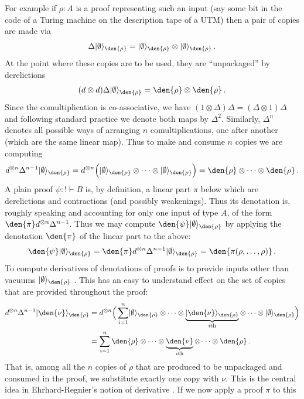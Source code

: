 \documentclass[english,letter paper,12pt,reqno]{article}
\DeclarePairedDelimiter\ket{\lvert}{\rangle}
\theoremstyle{definition}
\def\vacu{\ket{\emptyset}}
\def\be{\begin{equation}}
\def\ee{\end{equation}}
\begin{document}
For example if $\rho : A$ is a proof representing such an input (say some bit in the code of a Turing machine on the description tape of a UTM) then a pair of copies are made via
\be
\Delta \vacu_{\den{\rho}} = \vacu_{\den{\rho}} \otimes \vacu_{\den{\rho}}\,.
\ee
At the point where these copies are to be used, they are ``unpackaged'' by derelictions
\be\label{eq:d_otimes_2}
(d \otimes d) \Delta \vacu_{\den{\rho}} = \den{\rho} \otimes \den{\rho}\,.
\ee
Since the comultiplication is co-associative, we have $(1 \otimes \Delta)\Delta = (\Delta \otimes 1)\Delta$ and following standard practice we denote both maps by $\Delta^2$. Similarly, $\Delta^n$ denotes all possible ways of arranging $n$ comultiplications, one after another (which are the same linear map). Thus to make and consume $n$ copies we are computing
\be
d^{\otimes n} \Delta^{n-1} \vacu_{\den{\rho}} = d^{\otimes n} \Big( \vacu_{\den{\rho}} \otimes \cdots \otimes \vacu_{\den{\rho}} \Big) = \den{\rho} \otimes \cdots \otimes \den{\rho}\,.
\ee
A plain proof $\psi: {!} \vdash B$ is, by definition, a linear part $\pi$ below which are derelictions and contractions (and possibly weakenings). Thus its denotation is, roughly speaking and accounting for only one input of type $A$, of the form $\den{\pi} d^{\otimes n} \Delta^{n-1}$. Thus we may compute $\den{\psi}\vacu_{\den{\rho}}$ by applying the denotation $\den{\pi}$ of the linear part to the above:
\be\label{eq:normal_evaluation}
\den{\psi} \vacu_{\den{\rho}} = \den{\pi} d^{\otimes n} \Delta^{n-1} \vacu_{\den{\rho}} = \den{\pi(\rho,\ldots,\rho)}\,.
\ee
To compute derivatives of denotations of proofs is to provide inputs other than vacuums $\vacu_{\den{\rho}}$ \cite[Corollary 4.5]{clift2018derivatives}. This has an easy to understand effect on the set of copies that are provided throughout the proof:
\begin{align}
d^{\otimes n} \Delta^{n-1} \ket{\den{\nu}}_{\den{\rho}} &= d^{\otimes n} \Big( \sum_{i=1}^n \vacu_{\den{\rho}} \otimes \cdots \otimes \underbrace{\ket{\den{\nu}}_{\den{\rho}}}_{i\text{th}} \otimes \cdots \otimes \vacu_{\den{\rho}} \Big) \nonumber\\
&= \sum_{i=1}^n \den{\rho} \otimes \cdots \otimes \underbrace{\den{\nu}}_{i\text{th}} \otimes \cdots \otimes \den{\rho}\,.
\end{align}
That is, among all the $n$ copies of $\rho$ that are produced to be unpackaged and consumed in the proof, we substitute exactly one copy with $\nu$. This is the central idea in Ehrhard-Regnier's notion of derivative \cite{ehrhard2003differential}. If we now apply a proof $\pi$ to this
\end{document}
